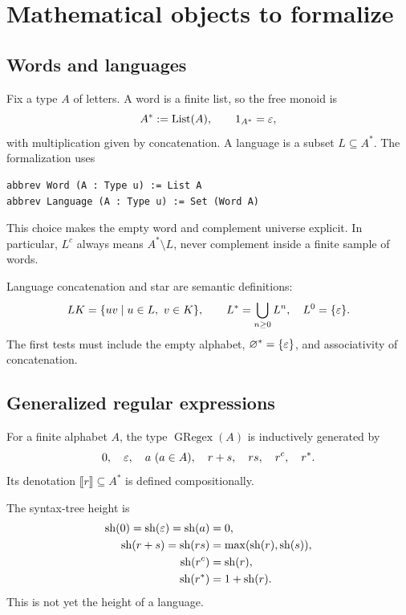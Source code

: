 \documentclass{amsart}
\begin{document}
\section{Mathematical objects to formalize}

\subsection{Words and languages}

Fix a type $A$ of letters.  A word is a finite list, so the free monoid is
\[
  A^\ast := \operatorname{List}(A), \qquad 1_{A^\ast}=\varepsilon,
\]
with multiplication given by concatenation.  A language is a subset $L\subseteq A^\ast$.  The formalization uses
\begin{lstlisting}[language={},caption={Core Lean representations.}]
abbrev Word (A : Type u) := List A
abbrev Language (A : Type u) := Set (Word A)
\end{lstlisting}
This choice makes the empty word and complement universe explicit.  In particular, $L^c$ always means $A^\ast\setminus L$, never complement inside a finite sample of words.

Language concatenation and star are semantic definitions:
\[
LK=\{uv\mid u\in L,\ v\in K\},\qquad
L^\ast=\bigcup_{n\geq 0}L^n,\quad L^0=\{\varepsilon\}.
\]
The first tests must include the empty alphabet, $\varnothing^\ast=\{\varepsilon\}$, and associativity of concatenation.

\subsection{Generalized regular expressions}

\begin{definition}
For a finite alphabet $A$, the type $\operatorname{GRegex}(A)$ is inductively generated by
\[
0,\quad \varepsilon,\quad a\ (a\in A),\quad r+s,\quad rs,\quad r^c,\quad r^\ast.
\]
Its denotation $\llbracket r\rrbracket\subseteq A^\ast$ is defined compositionally.
\end{definition}

The syntax-tree height is
\[
\begin{aligned}
\operatorname{sh}(0)=\operatorname{sh}(\varepsilon)=\operatorname{sh}(a)&=0,\\
\operatorname{sh}(r+s)=\operatorname{sh}(rs)&=\max(\operatorname{sh}(r),\operatorname{sh}(s)),\\
\operatorname{sh}(r^c)&=\operatorname{sh}(r),\\
\operatorname{sh}(r^\ast)&=1+\operatorname{sh}(r).
\end{aligned}
\]
This is not yet the height of a language.
\end{document}

